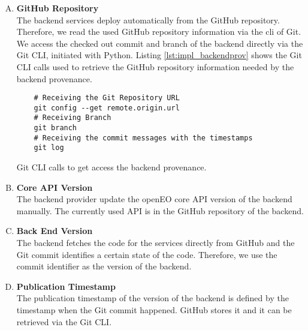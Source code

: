\documentclass[draft,final]{vutinfth} %
\newenvironment{code}{\captionsetup{type=listing}}{}
\begin{document}
\begin{enumerate}[(A)]
\item \textbf{GitHub Repository} \\
	The backend services deploy automatically from the GitHub repository. Therefore, we read the used GitHub repository information via the \gls{cli} of Git. We access the checked out commit and branch of the backend directly via the Git CLI, initiated with Python. Listing \ref{lst:impl_backendprov} shows the Git CLI calls used to retrieve the GitHub repository information needed by the backend provenance.      
\begin{code}
	\begin{verbatim}
	# Receiving the Git Repository URL
	git config --get remote.origin.url 
	# Receiving Branch
	git branch
	# Receiving the commit messages with the timestamps
	git log 
	\end{verbatim}
	\caption{Git CLI calls to get access the backend provenance.}
	\label{lst:impl_backendprov}
\end{code}

\item \textbf{Core API Version} \\
	The backend provider update the openEO core API version of the backend manually. The currently used API is in the GitHub repository of the backend. 

\item \textbf{Back End Version} \\
	The backend fetches the code for the services directly from GitHub and the Git commit identifies a certain state of the code. Therefore, we use the commit identifier as the version of the backend.

\item \textbf{Publication Timestamp} \\
	The publication timestamp of the version of the backend is defined by the timestamp when the Git commit happened. GitHub stores it and it can be retrieved via the Git CLI. 
\end{enumerate}
\end{document}
